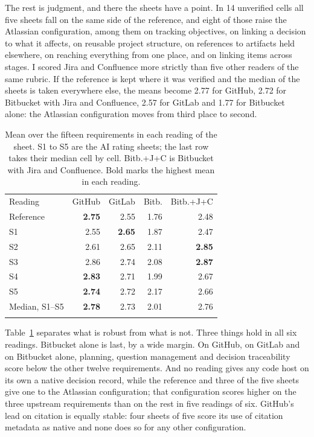 \documentclass{IEEEcsmag}
\begin{document}
The rest is judgment, and there the sheets have a point. In 14 unverified cells all five sheets fall on the same side of the reference, and eight of those raise the Atlassian configuration, among them on tracking objectives, on linking a decision to what it affects, on reusable project structure, on references to artifacts held elsewhere, on reaching everything from one place, and on linking items across stages. I scored Jira and Confluence more strictly than five other readers of the same rubric. If the reference is kept where it was verified and the median of the sheets is taken everywhere else, the means become 2.77 for GitHub, 2.72 for Bitbucket with Jira and Confluence, 2.57 for GitLab and 1.77 for Bitbucket alone: the Atlassian configuration moves from third place to second.

\begin{table}[t]
\caption{Mean over the fifteen requirements in each reading of the sheet. S1 to S5 are the AI rating sheets; the last row takes their median cell by cell. Bitb.+J+C is Bitbucket with Jira and Confluence. Bold marks the highest mean in each reading.}\label{tab:readings}
\tablefont
\setlength{\tabcolsep}{3pt}
\begin{tabular*}{\columnwidth}{@{\extracolsep{\fill}}lrrrr@{}}
\toprule
Reading& GitHub& GitLab& Bitb.& Bitb.+J+C\\
\colrule
Reference& \textbf{2.75}& 2.55& 1.76& 2.48\\
S1& 2.55& \textbf{2.65}& 1.87& 2.47\\
S2& 2.61& 2.65& 2.11& \textbf{2.85}\\
S3& 2.86& 2.74& 2.08& \textbf{2.87}\\
S4& \textbf{2.83}& 2.71& 1.99& 2.67\\
S5& \textbf{2.74}& 2.72& 2.17& 2.66\\
\colrule
Median, S1--S5& \textbf{2.78}& 2.73& 2.01& 2.76\\
\botrule
\end{tabular*}
\end{table}

Table~\ref{tab:readings} separates what is robust from what is not. Three things hold in all six readings. Bitbucket alone is last, by a wide margin. On GitHub, on GitLab and on Bitbucket alone, planning, question management and decision traceability score below the other twelve requirements. And no reading gives any code host on its own a native decision record, while the reference and three of the five sheets give one to the Atlassian configuration; that configuration scores higher on the three upstream requirements than on the rest in five readings of six. GitHub's lead on citation is equally stable: four sheets of five score its use of citation metadata as native and none does so for any other configuration.
\end{document}
